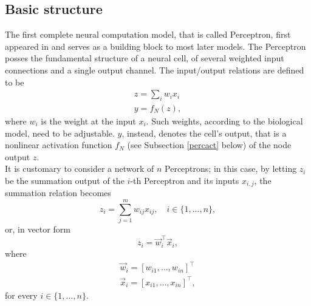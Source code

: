 \documentclass[%
    corpo=11pt,
    twoside,
    stile=classica,
    oldstyle,
    autoretitolo,
    tipotesi=magistrale,
    greek,
    evenboxes,
    english
]{toptesi}
\begin{document}
\subsection{Basic structure}
\label{percbs}
The first complete neural computation model, that is called Perceptron, first appeared in \citep{rosenblatt} and serves as a building block to most later models. The Perceptron posses the fundamental structure of a neural cell, of several weighted input connections and a single output channel. The input/output relations are defined to be
\begin{align}
z = \sum_{i}w_i x_i \\
y = f_N(z),
\end{align}
where $w_i$ is the weight at the input $x_i$. Such weights, according to the biological model, need to be adjustable. $y$, instead, denotes the cell's output, that is a nonlinear activation function $f_N$ (see Subsection \ref{percact} below) of the node output $z$. \\
It is customary to consider a network of $n$ Perceptrons; in this case, by letting $z_i$ be the summation output of the $i$-th Perceptron and its inputs $x_{i,j}$, the summation relation becomes
\begin{equation}
z_i = \sum_{j=1}^{m}w_{ij} x_{ij}, \quad i \in \{1,\dots,n\},
\end{equation}
or, in vector form 
\begin{equation}
\label{percout}
z_i = \vec{w}_i^{\intercal}\vec{x}_i,
\end{equation}
where
\begin{align*}
\vec{w}_i = \left[w_{i1}, \dots, w_{in} \right]^\intercal \\
\vec{x}_i = \left[x_{i1}, \dots, x_{in} \right]^\intercal,
\end{align*}
for every $i \in \{1,\dots,n\}$. 
\end{document}
